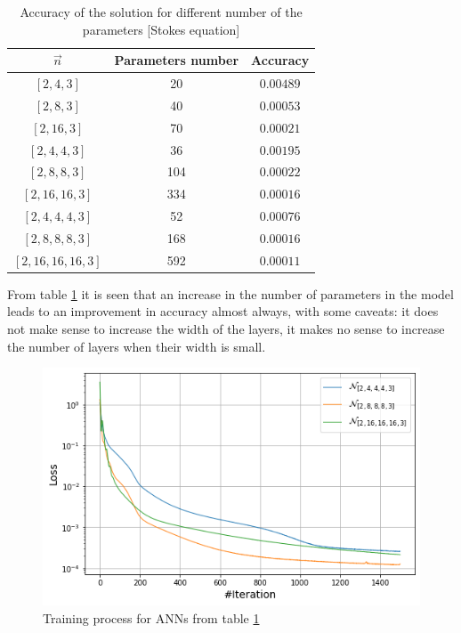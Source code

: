 \begin{table}
	\centering
	\begin{tabular}{| c | c | c |} 
	\hline
		$\vec{n}$ & Parameters number & Accuracy \\ \hline
		$[2, 4, 3]$ & 20 & $0.00489$ \\ \hline
		$[2, 8, 3]$ & 40 & $0.00053$ \\ \hline
		$[2, 16, 3]$ & 70 & $0.00021$ \\ \hline
		$[2, 4, 4, 3]$ & 36 & $0.00195$ \\ \hline
		$[2, 8, 8, 3]$ & 104 & $0.00022$ \\ \hline
		$[2, 16, 16, 3]$ & 334 & $0.00016$ \\ \hline
		$[2, 4, 4, 4, 3]$ & 52 & $0.00076$ \\ \hline
		$[2, 8, 8, 8, 3]$ & 168 & $0.00016$ \\ \hline
		$[2, 16, 16, 16, 3]$ & 592 & $0.00011$ \\ \hline
	\end{tabular}
	\caption{Accuracy of the solution for different number of the parameters [Stokes equation]}
	\label{table:stokes_tab}
\end{table}

From table \ref{table:stokes_tab} it is seen that an increase in the number of parameters in the model leads to an improvement in accuracy almost always, with some caveats: it does not make sense to increase the width of the layers, it makes no sense to increase the number of layers when their width is small.

\begin{figure}
	\centering
	\includegraphics[width=\textwidth]{images/chapter3/stokes_simple_nets_train.png}
	\caption{Training process for ANNs from table \ref{table:stokes_tab}}
	\label{fig:stokes_simple_nets_train}\tabularnewline
\end{figure}

